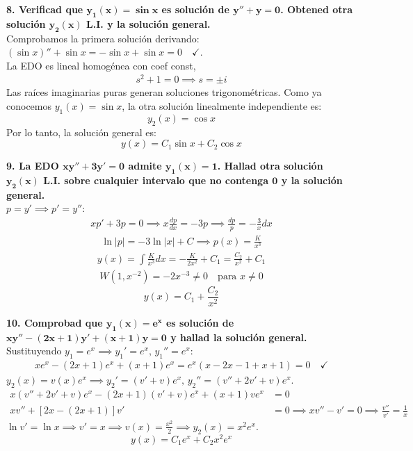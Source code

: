 \documentclass[11pt, a4paper]{article}
\begin{document}
\noindent\textbf{8. Verificad que $\bm{y_1(x)=\sin x}$ es solución de $\bm{y''+y=0}$. Obtened otra solución $\bm{y_2(x)}$ L.I. y la solución general.} \\
Comprobamos la primera solución derivando: $(\sin x)'' + \sin x = -\sin x + \sin x = 0 \quad \checkmark$. \\
La EDO es lineal homogénea con coef const,
\begin{align*}
s^2 + 1 = 0 \implies s = \pm i
\end{align*}
Las raíces imaginarias puras generan soluciones trigonométricas. Como ya conocemos $y_1(x) = \sin x$, la otra solución linealmente independiente es:
\[
y_2(x) = \cos x
\]
Por lo tanto, la solución general es:
\[
\boxed{y(x) = C_1 \sin x + C_2 \cos x}
\]


\noindent\textbf{9. La EDO $\bm{xy''+3y'=0}$ admite $\bm{y_1(x)=1}$. Hallad otra solución $\bm{y_2(x)}$ L.I. sobre cualquier intervalo que no contenga $\bm{0}$ y la solución general.} \\
$p = y' \implies p' = y''$:
\begin{align*}
x p' + 3p = 0 \implies x \frac{dp}{dx} = -3p \implies \frac{dp}{p} = -\frac{3}{x} dx
\end{align*}
\begin{align*}
\ln|p| = -3\ln|x| + C \implies p(x) = \frac{K}{x^3}
\end{align*}
\begin{align*}
y(x) = \int \frac{K}{x^3} dx = -\frac{K}{2x^2} + C_1 = \frac{C_2}{x^2} + C_1
\end{align*}
\begin{align*}
W(1, x^{-2}) = -2x^{-3} \neq 0 \quad \text{para } x \neq 0
\end{align*}
\[
\boxed{y(x) = C_1 + \frac{C_2}{x^2}}
\]


\noindent\textbf{10. Comprobad que $\bm{y_1(x)=e^x}$ es solución de $\bm{xy''-(2x+1)y'+(x+1)y=0}$ y hallad la solución general.} \\
Sustituyendo $y_1 = e^x \implies y_1' = e^x, \, y_1'' = e^x$:
\begin{align*}
x e^x - (2x+1)e^x + (x+1)e^x = e^x(x - 2x - 1 + x + 1) = 0 \quad \checkmark
\end{align*}
$y_2(x) = v(x) e^x \implies y_2' = (v'+v)e^x, \, y_2'' = (v''+2v'+v)e^x$.
\begin{align*}
x(v''+2v'+v)e^x - (2x+1)(v'+v)e^x + (x+1)v e^x &= 0 \\
x v'' + [2x - (2x+1)] v' &= 0 \implies x v'' - v' = 0 \implies \frac{v''}{v'} = \frac{1}{x}
\end{align*}
$\ln v' = \ln x \implies v' = x \implies v(x) = \frac{x^2}{2} \implies y_2(x) = x^2 e^x$.
\[
\boxed{y(x) = C_1 e^x + C_2 x^2 e^x}
\]
\end{document}
